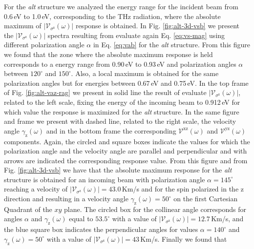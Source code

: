 \documentclass[prb,11pt,tightenlines,twocolumn,aps]{revtex4-1}
\begin{document}
For the \emph{alt} structure we analyzed the energy range for the incident beam
from 0.6\,eV to 1.0\,eV, corresponding to the THz radiation, where the absolute
maximum of $|\mathcal{V}_{\sigma^{\mathrm{z}}}(\omega)|$ response is obtained.
% 
In Fig. \ref{fig:alt-3d-vsb} we present the
$|\mathcal{V}_{\sigma^{\mathrm{z}}}(\omega)|$ spectra resulting from evaluate
again Eq. \eqref{eq:vs-mag} using different polarization angle $\alpha$ in Eq.
\eqref{eq:vab} for the \emph{alt} structure.
% 
From this figure we found that the zone where the absolute maximum response is
held corresponds to a energy range from 0.90\,eV to 0.93\,eV and polarization
angles $\alpha$ between $120^{\circ}$ and $150^{\circ}$. Also, a local maximum
is obtained for the same polarization angles but for energies between 0.67\,eV
and 0.75\,eV.
In the top frame of Fig. \ref{fig:alt-vaz-rag} we present in solid line the
result of evaluate $|\mathcal{V}_{\sigma^{\mathrm{z}}}(\omega)|$, related to the
left scale, fixing the energy of the incoming beam to 0.912\,eV for which value
the response is maximized for the \emph{alt} structure. In the same figure and
frame we present with dashed line, related to the right scale, the velocity
angle $\gamma_{\mathrm{z}}(\omega)$ and in the bottom frame the corresponding
$\mathcal{V}^{\mathrm{xz}}(\omega)$ and $\mathcal{V}^{\mathrm{yz}}(\omega)$
components. Again, the circled and square boxes indicate the values for which
the polarization angle and the velocity angle are parallel and perpendicular and
with arrows are indicated the corresponding response value.
% 
From this figure and from Fig. \ref{fig:alt-3d-vsb} we have that the absolute
maximum response for the \emph{alt} structure is obtained for an incoming beam
with polarization angle $\alpha=145^{\circ}$ reaching a velocity of
$|\mathcal{V}_{\sigma^{\mathrm{z}}}(\omega)|=43.0$\,Km/s and for the spin
polarized in the $\mathrm{z}$ direction and resulting in a velocity angle
$\gamma_{\mathrm{z}}(\omega)=50^{\circ}$ on the first Cartesian Quadrant of the
$xy$ plane. The circled box for the collinear angle corresponds for angles
$\alpha$ and $\gamma_{\mathrm{z}}(\omega)$ equal to $53.5^{\circ}$ with a value
of $|\mathcal{V}_{\sigma^{\mathrm{z}}}(\omega)|=12.7$\,Km/s, and the blue square
box indicates the perpendicular angles for values $\alpha=140^{\circ}$ and
$\gamma_{\mathrm{z}}(\omega)=50^{\circ}$ with a value of
$|\mathcal{V}_{\sigma^{\mathrm{z}}}(\omega)|=43$\,Km/s. Finally we found that
\end{document}
